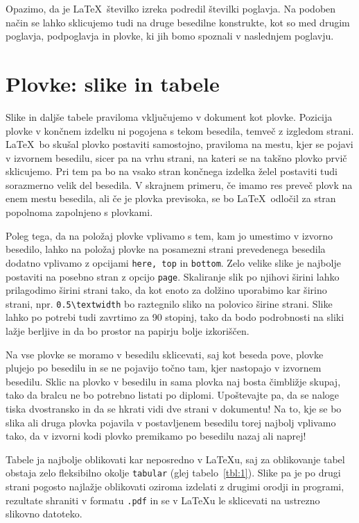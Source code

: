 \documentclass[a4paper, 12pt]{book}
\begin{document}
Opazimo, da je \LaTeX\ številko izreka podredil številki poglavja.
Na podoben način se lahko sklicujemo tudi na druge besedilne konstrukte, kot so med drugim poglavja, podpoglavja in plovke, ki jih bomo spoznali v naslednjem poglavju.


\chapter{Plovke: slike in tabele}
\label{ch2}

Slike in daljše tabele praviloma vključujemo v dokument kot plovke. 
Pozicija plovke v končnem izdelku ni pogojena s tekom besedila, temveč z izgledom strani. 
\LaTeX\ bo skušal plovko postaviti samostojno, praviloma na mestu, kjer se pojavi v izvornem besedilu, sicer pa na 
vrhu strani, na kateri se na takšno plovko prvič sklicujemo. 
Pri tem pa bo na vsako stran končnega izdelka želel postaviti tudi sorazmerno velik del besedila. 
V skrajnem primeru, če imamo res preveč plovk na enem mestu besedila, ali če je plovka previsoka, se bo \LaTeX\ odločil za stran popolnoma zapolnjeno s plovkami.

Poleg tega, da na položaj plovke vplivamo s tem, kam jo umestimo v izvorno besedilo, lahko na položaj plovke na posamezni strani prevedenega besedila dodatno vplivamo z opcijami \texttt{here, top} in \texttt{bottom}.
Zelo velike slike je najbolje postaviti na posebno stran z opcijo \texttt{page}.
Skaliranje slik po njihovi širini lahko prilagodimo širini strani tako, da kot enoto za dolžino uporabimo kar širino strani, npr. \verb=0.5\textwidth= bo raztegnilo sliko na polovico širine strani.
Slike lahko po potrebi tudi zavrtimo za 90 stopinj, tako da bodo podrobnosti na sliki lažje berljive in da bo prostor na papirju bolje izkoriščen.

Na vse plovke se moramo v besedilu sklicevati, saj kot beseda pove, plovke plujejo po besedilu in se ne pojavijo točno tam, kjer nastopajo v izvornem besedilu.
Sklic na plovko v besedilu in sama plovka naj bosta čimbližje skupaj, tako da bralcu ne bo potrebno listati po diplomi. 
Upoštevajte pa, da se naloge tiska dvostransko in da se hkrati vidi dve strani v dokumentu!
Na to, kje se bo slika ali druga plovka pojavila v postavljenem besedilu torej najbolj vplivamo tako, da v izvorni kodi plovko premikamo po besedilu nazaj ali naprej!

Tabele ja najbolje oblikovati kar neposredno v \LaTeX u, saj za oblikovanje tabel obstaja zelo fleksibilno okolje \texttt{tabular} (glej tabelo~\ref{tbl:1}).
Slike pa je po drugi strani  pogosto najla\v zje oblikovati oziroma izdelati z drugimi orodji in programi, rezultate shraniti v formatu {\tt .pdf}  in se v \LaTeX u le sklicevati na ustrezno slikovno datoteko.
\end{document}
